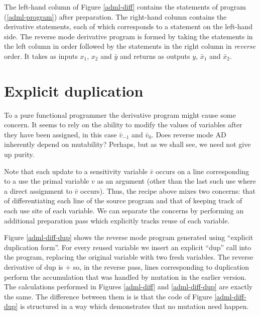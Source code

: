 \documentclass[12pt]{article}
\newcommand{\dup}{\mathrm{dup}}
\begin{document}
The left-hand column of Figure \ref{adml-diff} contains the statements
of program (\ref{adml-program}) after preparation.  The right-hand
column contains the derivative statements, each of which corresponds
to a statement on the left-hand side.  The reverse mode derivative
program is formed by taking the statements in the left column in order
followed by the statements in the right column in \emph{reverse}
order.  It takes as inputs $x_1$, $x_2$ and $\bar{y}$ and returns as
outputs $y$, $\bar{x}_1$ and $\bar{x}_2$.

\section{Explicit duplication}

To a pure functional programmer the derivative program might cause
some concern.  It seems to rely on the ability to modify the values of
variables after they have been assigned, in this case \(\bar{v}_{-1}\)
and \(\bar{v}_0\).  Does reverse mode AD inherently depend on
mutability?  Perhaps, but as we shall see, we need not give up purity.

Note that each update to a sensitivity variable $\bar{v}$ occurs on a
line corresponding to a use the primal variable $v$ as an argument
(other than the last such use where a direct assignment to $\bar{v}$
occurs). Thus, the recipe above mixes two concerns: that of
differentiating each line of the source program and that of keeping
track of each use site of each variable.  We can separate the concerns
by performing an additional preparation pass which explicitly tracks
reuse of each variable.

Figure \ref{adml-diff-dup} shows the reverse mode program generated
using ``explicit duplication form''. For every reused variable we
insert an explicit ``$\dup$'' call into the program, replacing the
original variable with two fresh variables.  The reverse derivative of
$\dup$ is $+$ so, in the reverse pass, lines corresponding to
duplication perform the accumulation that was handled by mutation in
the earlier version.  The calculations performed in Figures
\ref{adml-diff} and \ref{adml-diff-dup} are exactly the same.  The
difference between them is is that the code of Figure
\ref{adml-diff-dup} is structured in a way which demonstrates that no
mutation need happen.
\end{document}
